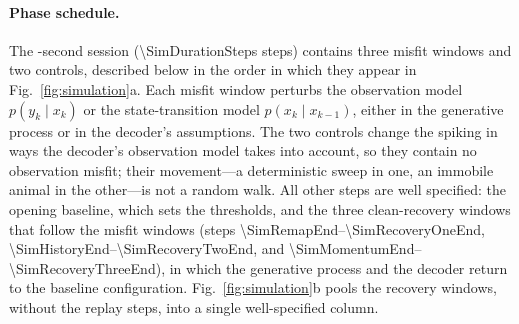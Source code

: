\documentclass[12pt]{article}
\begin{document}
\paragraph{Phase schedule.}
The \SimDurationSeconds-second session (\num{\SimDurationSteps} steps) contains three misfit windows and two controls, described below in the order in which they appear in Fig.~\ref{fig:simulation}a. Each misfit window perturbs the observation model $p(y_k \mid x_k)$ or the state-transition model $p(x_k \mid x_{k-1})$, either in the generative process or in the decoder's assumptions. The two controls change the spiking in ways the decoder's observation model takes into account, so they contain no observation misfit; their movement---a deterministic sweep in one, an immobile animal in the other---is not a random walk. All other steps are well specified: the opening baseline, which sets the thresholds, and the three clean-recovery windows that follow the misfit windows (steps \num{\SimRemapEnd}--\num{\SimRecoveryOneEnd}, \num{\SimHistoryEnd}--\num{\SimRecoveryTwoEnd}, and \num{\SimMomentumEnd}--\num{\SimRecoveryThreeEnd}), in which the generative process and the decoder return to the baseline configuration. Fig.~\ref{fig:simulation}b pools the recovery windows, without the replay steps, into a single well-specified column.
\end{document}
